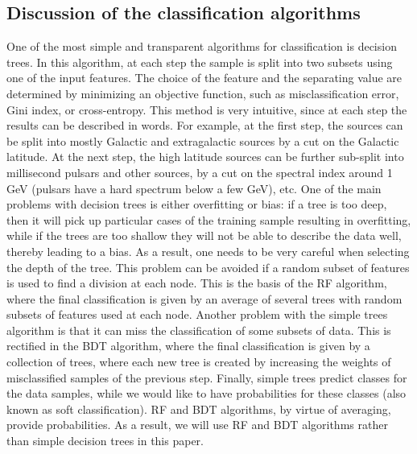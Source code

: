\documentclass{aa}
\newcommand{\lb}{\label}
\begin{document}
\subsection{Discussion of the classification algorithms}
\lb{sec:class_alg}


One of the most simple and transparent algorithms for classification is decision trees.
In this algorithm, at each step the sample is split into two subsets using one of the input features.
The choice of the feature and the separating value are determined by minimizing an objective function, such as misclassification
error, Gini index, or cross-entropy.
This method is very intuitive, since at each step the results can be described in words. 
For example, at the first step, the sources can be split into mostly Galactic and extragalactic sources by a cut on the Galactic latitude.
At the next step, the high latitude sources can be further sub-split into millisecond pulsars and other sources, by a cut on the spectral index around 1 GeV (pulsars have a hard spectrum below a few GeV), etc.
One of the main problems with decision trees is either overfitting or bias: if a tree is too deep, then it will pick up particular cases of the training sample resulting in overfitting, while if the trees are too shallow they will not be able to describe the data well, thereby leading to a bias. 
As a result, one needs to be very careful when selecting the depth of the tree.
This problem can be avoided if a random subset of features is used to find a division at each node. This is the basis of the RF algorithm,
where the final classification is given by an average of several trees with random subsets of features used at each node.
Another problem with the simple trees algorithm is that it can miss the classification of some subsets of data. This is rectified in the BDT algorithm, where the final classification is given by a collection of trees, where each new tree is created by increasing the weights of misclassified samples of the previous step. 
Finally, simple trees predict classes for the data samples, while we would like to have probabilities for these classes (also known as soft classification).
RF and BDT algorithms, by virtue of averaging, provide probabilities. As a result, we will use RF and BDT algorithms rather than simple decision trees in this paper.
\end{document}
